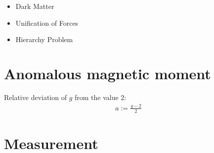 \documentclass[12pt]{beamer}
\begin{document}
\begin{frame}{\insertsection}
  \begin{itemize}
  \item Dark Matter
  \item Unification of Forces
  \item Hierarchy Problem
  \end{itemize}
\end{frame}


\section{Anomalous magnetic moment}

\begin{frame}{\insertsection}
  Relative deviation of $g$ from the value 2:
  \begin{align*}
    a := \frac{g-2}{2}
  \end{align*}
\end{frame}


\section{Measurement}




\end{document}
